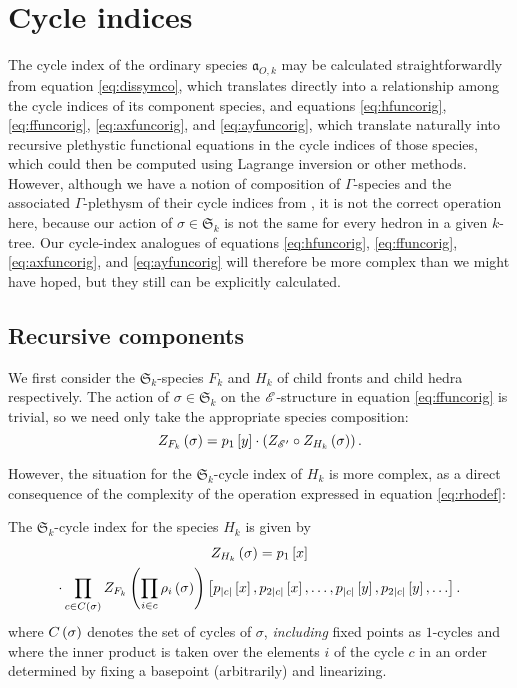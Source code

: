 \documentclass[sectionflow,singlespace,twoside,boldmathhdr]{brandiss} %
\numberwithin{section}{chapter}
\numberwithin{figure}{chapter}
\begin{document}
\section{Cycle indices}\label{s:ktcycind}
The cycle index of the ordinary species $\mathfrak{a}_{O, k}$ may be calculated straightforwardly from equation \eqref{eq:dissymco}, which translates directly into a relationship among the cycle indices of its component species, and equations \eqref{eq:hfuncorig}, \eqref{eq:ffuncorig}, \eqref{eq:axfuncorig}, and \eqref{eq:ayfuncorig}, which translate naturally into recursive plethystic functional equations in the cycle indices of those species, which could then be computed using Lagrange inversion or other methods.
However, although we have a notion of composition of $\Gamma$-species and the associated $\Gamma$-plethysm of their cycle indices from \cite[\S 3]{hend:specfield}, it is not the correct operation here, because our action of $\sigma \in \mathfrak{S}_{k}$ is not the same for every hedron in a given $k$-tree.
Our cycle-index analogues of equations \eqref{eq:hfuncorig}, \eqref{eq:ffuncorig}, \eqref{eq:axfuncorig}, and \eqref{eq:ayfuncorig} will therefore be more complex than we might have hoped, but they still can be explicitly calculated.

\subsection{Recursive components}\label{ss:ktcycindrec}
We first consider the $\mathfrak{S}_{k}$-species $F_{k}$ and $H_{k}$ of child fronts and child hedra respectively.
The action of $\sigma \in \mathfrak{S}_{k}$ on the $\mathscr{E}$-structure in equation \eqref{eq:ffuncorig} is trivial, so we need only take the appropriate species composition:
\begin{equation}
  \label{eq:ffunc}
  Z_{F_{k}} \left( {\sigma} \right) = p_{1} \left[ {y} \right] \cdot \left( {Z_{\mathscr{E}'} \circ Z_{H_{k}} \left( {\sigma} \right)} \right).
\end{equation}

However, the situation for the $\mathfrak{S}_{k}$-cycle index of $H_{k}$ is more complex, as a direct consequence of the complexity of the operation expressed in equation \eqref{eq:rhodef}:
\begin{theorem}
  \label{thm:hfunc}
  The $\mathfrak{S}_{k}$-cycle index for the species $H_{k}$ is given by
  \begin{multline}
    \label{eq:hfunc}
    Z_{H_{k}} \left( {\sigma} \right) = p_{1} \left[ {x} \right] \\
    \cdot \prod_{c \in C \left( {\sigma} \right)} Z_{F_{k}} \left( {\prod_{i \in c} \rho_{i} \left( {\sigma} \right)} \right) \left[ {p_{\left\vert {c} \right\vert} \left[ {x} \right], p_{2 \left\vert {c} \right\vert} \left[ {x} \right], \dots, p_{\left\vert {c} \right\vert} \left[ {y} \right], p_{2 \left\vert {c} \right\vert} \left[ {y} \right], \dots} \right].
  \end{multline}
  where $C \left( {\sigma} \right)$ denotes the set of cycles of $\sigma$, \emph{including} fixed points as $1$-cycles and where the inner product is taken over the elements $i$ of the cycle $c$ in an order determined by fixing a basepoint (arbitrarily) and linearizing.
\end{theorem}
\end{document}
